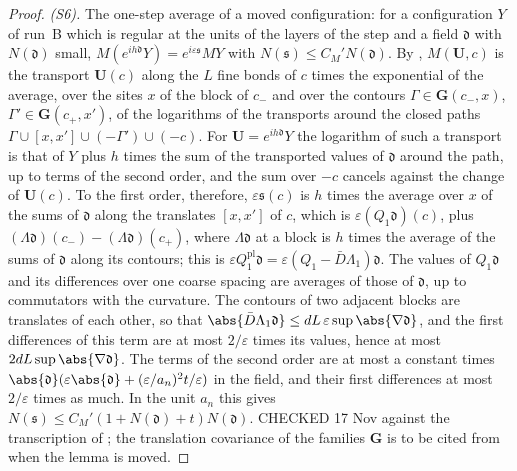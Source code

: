 \begin{proof}
\emph{(S6).} The one-step average of a moved configuration: for a configuration $Y$ of run~B which is regular at the units of the layers of the step and a field $\mathfrak d$ with $N(\mathfrak d)$ small, $M(e^{ih\mathfrak d}Y) = e^{i\varepsilon\mathfrak s}MY$ with $N(\mathfrak s) \leq C_M'N(\mathfrak d)$. By \cite[(0.4), p.~253]{BalabanRG1}, $M(\mathbf U, c)$ is the transport $\mathbf U(c)$ along the $L$ fine bonds of $c$ times the exponential of the average, over the sites $x$ of the block of $c_-$ and over the contours $\Gamma \in \mathbf G(c_-, x)$, $\Gamma' \in \mathbf G(c_+, x')$, of the logarithms of the transports around the closed paths $\Gamma \cup [x, x'] \cup (-\Gamma') \cup (-c)$. For $\mathbf U = e^{ih\mathfrak d}Y$ the logarithm of such a transport is that of $Y$ plus $h$ times the sum of the transported values of $\mathfrak d$ around the path, up to terms of the second order, and the sum over $-c$ cancels against the change of $\mathbf U(c)$. To the first order, therefore, $\varepsilon\mathfrak s(c)$ is $h$ times the average over $x$ of the sums of $\mathfrak d$ along the translates $[x, x']$ of $c$, which is $\varepsilon(Q_1\mathfrak d)(c)$, plus $(\Lambda\mathfrak d)(c_-) - (\Lambda\mathfrak d)(c_+)$, where $\Lambda\mathfrak d$ at a block is $h$ times the average of the sums of $\mathfrak d$ along its contours; this is $\varepsilon Q^{\mathrm{pl}}_1\mathfrak d = \varepsilon(Q_1 - \bar D\Lambda_1)\mathfrak d$. The values of $Q_1\mathfrak d$ and its differences over one coarse spacing are averages of those of $\mathfrak d$, up to commutators with the curvature. The contours of two adjacent blocks are translates of each other, so that $\abs{\bar D\Lambda_1\mathfrak d} \leq dL\,\varepsilon\sup\abs{\nabla\mathfrak d}$, and the first differences of this term are at most $2/\varepsilon$ times its values, hence at most $2dL\sup\abs{\nabla\mathfrak d}$. The terms of the second order are at most a constant times $\abs{\mathfrak d}(\varepsilon\abs{\mathfrak d} + (\varepsilon/a_n)^2t/\varepsilon)$ in the field, and their first differences at most $2/\varepsilon$ times as much. In the unit $a_n$ this gives $N(\mathfrak s) \leq C_M'(1 + N(\mathfrak d) + t)N(\mathfrak d)$. CHECKED 17 Nov against the transcription of \cite[p.~253]{BalabanRG1}; the translation covariance of the families $\mathbf G$ is to be cited from \cite{BalabanRG1} when the lemma is moved.
\end{proof}

